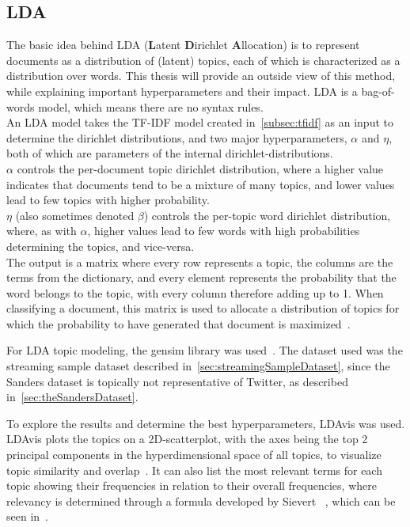 \subsection{LDA}
\label{subsec:lda}

The basic idea behind LDA (\textbf{L}atent \textbf{D}irichlet \textbf{A}llocation) is to represent documents as a distribution of (latent) topics,
each of which is characterized as a distribution over words.
This thesis will provide an outside view of this method, while explaining important hyperparameters and their impact.
LDA is a bag-of-words model, which means there are no syntax rules.
\\
An LDA model takes the TF-IDF model created in~\ref{subsec:tfidf} as an input to determine the dirichlet distributions,
and two major hyperparameters, $\alpha$ and $\eta$,
both of which are parameters of the internal dirichlet-distributions.
\\
$\alpha$ controls the per-document topic dirichlet distribution,
where a higher value indicates that documents tend to be a mixture of many topics,
and lower values lead to few topics with higher probability.
\\
$\eta$ (also sometimes denoted $\beta$) controls the per-topic word dirichlet distribution, where, as with $\alpha$,
higher values lead to few words with high probabilities determining the topics,
and vice-versa.
\\
The output is a matrix where every row represents a topic,
the columns are the terms from the dictionary,
and every element represents the probability that the word belongs to the topic,
with every column therefore adding up to 1.
When classifying a document, this matrix is used to allocate a distribution of topics for which the probability to have generated that document is maximized~\cite{Blei2003}.
\par
For LDA topic modeling, the gensim library was used~\cite{gensimDocs}.
The dataset used was the streaming sample dataset described in~\ref{sec:streamingSampleDataset},
since the Sanders dataset is topically not representative of Twitter, as described in~\ref{sec:theSandersDataset}.

To explore the results and determine the best hyperparameters, LDAvis was used.
LDAvis plots the topics on a 2D-scatterplot, with the axes being the top 2 principal components
in the hyperdimensional space of all topics, to visualize topic similarity and overlap~\cite{}.
It can also list the most relevant terms for each topic showing their frequencies in relation to their overall frequencies,
where relevancy is determined through a formula developed by Sievert \etAl~\cite{sievert2014ldavis},
which can be seen in~\cite{math:relevance}.

